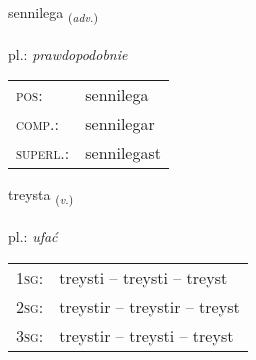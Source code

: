 \documentclass[frontgrid, backgrid]{flacards}\usepackage[]{graphicx}\usepackage[]{xcolor}
\begin{document}
\renewcommand{\flhead}{\vskip5pt \fboxsep=0pt {\small\bfseries\footnotesize Atviksorð | przysłówek}}
\renewcommand{\fcfoot}{\vskip5pt \fboxsep=0pt \hspace{2pt}{\small\bfseries\footnotesize 1K}}

\renewcommand{\blhead}{\vskip5pt {\small\bfseries\footnotesize Atviksorð | przysłówek }}
\renewcommand{\bcfoot}{\vskip5pt \hspace{2pt}{\small\bfseries\footnotesize 1K}}


{sennilega \small{\textsubscript{(\textit{adv.})}} \\[1ex] %
\textphonetic{[sɛnɪlɛɣa]} \\
pl.: \emph{prawdopodobnie} \\  [2ex]
\renewcommand*{\arraystretch}{0.8}
\begin{tabular}{ll}
\textsc{pos}: & sennilega \\ 
\textsc{comp.}: & sennilegar \\ 
\textsc{superl.}: & sennilegast \\
\end{tabular}
}

\renewcommand{\flhead}{\vskip5pt \fboxsep=0pt {\small\bfseries\footnotesize Sagnorð | czasownik}}
\renewcommand{\fcfoot}{\vskip5pt \fboxsep=0pt \hspace{2pt}{\small\bfseries\footnotesize 1K}}

\renewcommand{\blhead}{\vskip5pt {\small\bfseries\footnotesize Sagnorð | czasownik }}
\renewcommand{\bcfoot}{\vskip5pt \hspace{2pt}{\small\bfseries\footnotesize 1K}}


{treysta \small{\textsubscript{(\textit{v.})}} \\[1ex] %
\textphonetic{[tʰreista]} \\
pl.: \emph{ufać} \\  [2ex]
\renewcommand*{\arraystretch}{0.8}
\begin{tabular}{p{1cm}l}
\textsc{1sg}: & treysti -- treysti -- treyst \\ 
\textsc{2sg}: & treystir -- treystir -- treyst \\ 
\textsc{3sg}: & treystir -- treysti -- treyst \\ 
\end{tabular}
}
\end{document}

